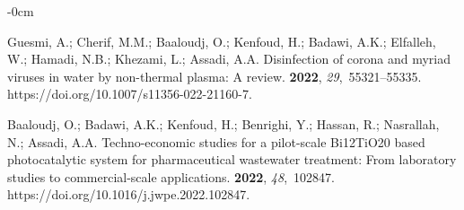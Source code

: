 \documentclass[gels,article,accept,pdftex,moreauthors]{Definitions/mdpi}
\begin{document}


\begin{adjustwidth}{-\extralength}{0cm}



%
\begin{thebibliography}{999}

Guesmi, A.; Cherif, M.M.; Baaloudj, O.; Kenfoud, H.; Badawi, A.K.; Elfalleh,
  W.; Hamadi, N.B.; Khezami, L.; Assadi, A.A.
\newblock Disinfection of corona and myriad viruses in water by non-thermal
  plasma: A review.
 {\bf 2022}, {\em 29},~55321--55335.
\newblock
  https://doi.org/10.1007/s11356-022-21160-7.%

Baaloudj, O.; Badawi, A.K.; Kenfoud, H.; Benrighi, Y.; Hassan, R.; Nasrallah,
  N.; Assadi, A.A.
\newblock Techno-economic studies for a pilot-scale Bi12TiO20 based
  photocatalytic system for pharmaceutical wastewater treatment: From
  laboratory studies to commercial-scale applications.
 {\bf 2022}, {\em
  48},~102847.
\newblock
  https://doi.org/10.1016/j.jwpe.2022.102847.%


\end{thebibliography}
\end{adjustwidth}
\end{document}
